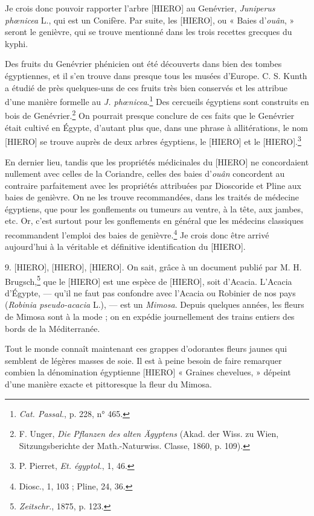 \documentclass[a4paper, 11pt, oneside]{article}
\begin{document}
Je crois donc pouvoir rapporter l'arbre [HIERO] au Genévrier, \emph{Juniperus phœnicea} L., qui est un Conifère. Par suite, les [HIERO], ou « Baies d'\emph{ouân}, » seront le genièvre, qui se trouve mentionné dans les trois recettes grecques du kyphi.

Des fruits du Genévrier phénicien ont été découverts dans bien des tombes égyptiennes, et il s'en trouve dans presque tous les musées d'Europe. C. S. Kunth a étudié de près quelques-uns de ces fruits très bien conservés et les attribue d'une manière formelle au \emph{J. phœnicea}.\footnote{\emph{Cat. Passal.}, p. 228, n° 465.} Des cercueils égyptiens sont construits en bois de Genévrier.\footnote{F. Unger, \emph{Die Pflanzen des alten Ägyptens} (Akad. der Wiss. zu Wien, Sitzungsberichte der Math.-Naturwiss. Classe, 1860, p. 109).} On pourrait presque conclure de ces faits que le Genévrier était cultivé en Égypte, d'autant plus que, dans une phrase à allitérations, le nom [HIERO] se trouve auprès de deux arbres égyptiens, le [HIERO] et le [HIERO].\footnote{P. Pierret, \emph{Et. égyptol.}, 1, 46.}

En dernier lieu, tandis que les propriétés médicinales du [HIERO] ne concordaient nullement avec celles de la Coriandre, celles des baies d'\emph{ouân} concordent au contraire parfaitement avec les propriétés attribuées par Dioscoride et Pline aux baies de genièvre. On ne les trouve recommandées, dans les traités de médecine égyptiens, que pour les gonflements ou tumeurs au ventre, à la tête, aux jambes, etc. Or, c'est surtout pour les gonflements en général que les médecins classiques recommandent l'emploi des baies de genièvre.\footnote{Diosc., 1, 103 ; Pline, 24, 36.} Je crois donc être arrivé aujourd'hui à la véritable et définitive identification du [HIERO].

9. [HIERO], [HIERO], [HIERO]. On sait, grâce à un document publié par M. H. Brugsch,\footnote{\emph{Zeitschr.}, 1875, p. 123.} que le [HIERO] est une espèce de [HIERO], soit d'Acacia. L'Acacia d'Égypte, --- qu'il ne faut pas confondre avec l'Acacia ou Robinier de nos pays (\emph{Robinia pseudo-acacia} L.), --- est un \emph{Mimosa}. Depuis quelques années, les fleurs de Mimosa sont à la mode ; on en expédie journellement des trains entiers des bords de la Méditerranée.

Tout le monde connaît maintenant ces grappes d'odorantes fleurs jaunes qui semblent de légères masses de soie. Il est à peine besoin de faire remarquer combien la dénomination égyptienne [HIERO] « Graines chevelues, » dépeint d'une manière exacte et pittoresque la fleur du Mimosa.
\end{document}
